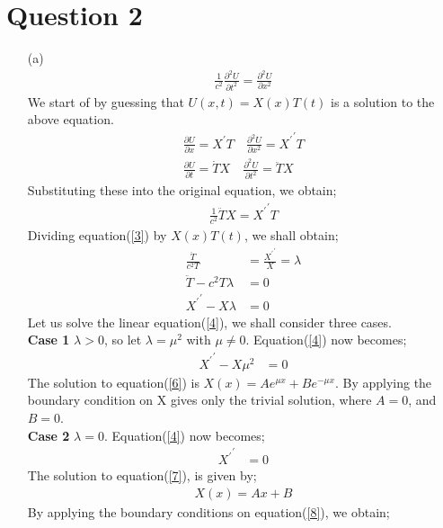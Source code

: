 \documentclass[12pt,a4paper]{article}
\begin{document}
\section*{Question 2}
\begin{itemize}
\item[(a)]
\begin{align*}
\frac{1}{c^{2}}\frac{\partial ^{2}U}{\partial t^{2}}=\frac{\partial ^{2}U}{\partial x^{2}}
\end{align*}
We start of by guessing that $U(x,t)=X(x)T(t)$ is a solution to the above equation.
\begin{align*}
\frac{\partial U}{\partial x}=X^{\prime}T \quad \frac{\partial^{2} U}{\partial x^{2}}={X^{\prime}}^{\prime}T\\
\frac{\partial U}{\partial t}=\dot{T}X \quad \frac{\partial^{2} U}{\partial t^{2}}=\ddot{T}X
\end{align*}
Substituting these into the original equation, we obtain;
\begin{align}
\frac{1}{c^{2}}\ddot{T}X={X^{\prime}}^{\prime}T \label{3}
\end{align}
Dividing equation(\ref{3}) by $X(x)T(t)$, we shall obtain;
\begin{align}
\frac{\ddot{T}}{c^{2}T}&=\frac{{X^{\prime}}^{\prime}}{X}=\lambda\\
\ddot{T}-c^{2}T\lambda &=0 \label{5}\\
{X^{\prime}}^{\prime}-X\lambda&=0 \label{4}
\end{align}
Let us solve the linear equation(\ref{4}), we shall consider three cases.\\
\textbf{Case 1} $\lambda >0$, so let $\lambda=\mu^{2}$ with $\mu \neq 0$. Equation(\ref{4}) now becomes;
\begin{align}
{X^{\prime}}^{\prime}-X\mu^{2}&=0 \label{6}
\end{align}
The solution  to equation(\ref{6}) is $X(x)=Ae^{\mu x}+Be^{-\mu x}$. By applying the boundary condition on X gives only the trivial solution, where $A=0$, and $B=0$.\\
\newline
\textbf{Case 2} $\lambda =0$. Equation(\ref{4}) now becomes;
\begin{align}
{X^{\prime}}^{\prime}&=0 \label{7}
\end{align}
The solution to equation(\ref{7}), is given by;
\begin{align}
X(x)=Ax+B \label{8}
\end{align}
By applying the boundary conditions on equation(\ref{8}), we obtain;

\end{itemize}
\end{document}
